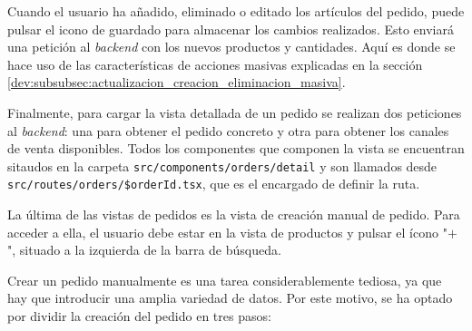 Cuando el usuario ha añadido, eliminado o editado los artículos del pedido, puede pulsar el icono de guardado para almacenar los cambios realizados. Esto enviará una petición al \textit{backend} con los nuevos productos y cantidades. Aquí es donde se hace uso de las características de acciones masivas explicadas en la sección \ref{dev:subsubsec:actualizacion_creacion_eliminacion_masiva}.

Finalmente, para cargar la vista detallada de un pedido se realizan dos peticiones al \textit{backend}: una para obtener el pedido concreto y otra para obtener los canales de venta disponibles. Todos los componentes que componen la vista se encuentran sitaudos en la carpeta \texttt{src/components/orders/detail} y son llamados desde \texttt{src/routes/orders/\$orderId.tsx}, que es el encargado de definir la ruta.

La última de las vistas de pedidos es la vista de creación manual de pedido. Para acceder a ella, el usuario debe estar en la vista de productos y pulsar el ícono "$+$", situado a la izquierda de la barra de búsqueda.

Crear un pedido manualmente es una tarea considerablemente tediosa, ya que hay que introducir una amplia variedad de datos. Por este motivo, se ha optado por dividir la creación del pedido en tres pasos:

